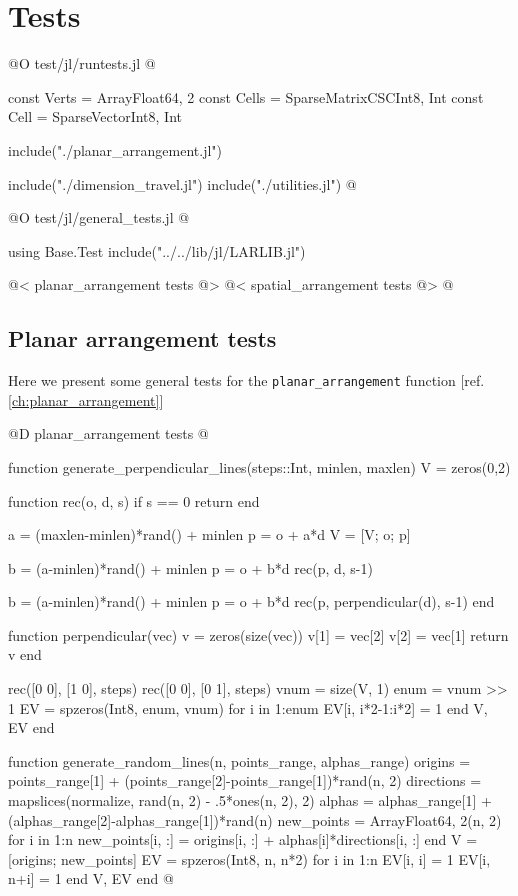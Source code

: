 \chapter{Tests}

@O test/jl/runtests.jl
@{const Verts = Array{Float64, 2}
const Cells = SparseMatrixCSC{Int8, Int}
const Cell = SparseVector{Int8, Int}

include("./planar_arrangement.jl")

include("./dimension_travel.jl")
include("./utilities.jl")
@}

@O test/jl/general_tests.jl
@{using Base.Test
include("../../lib/jl/LARLIB.jl")

@< planar\_arrangement tests @>
@< spatial\_arrangement tests @>
@}

\section{Planar arrangement tests}
\label{ch:planar_arrangement_tests}

Here we present some general tests for the \texttt{planar\_arrangement} function [ref. \ref{ch:planar_arrangement}]

@D planar\_arrangement tests
@{function generate_perpendicular_lines(steps::Int, minlen, maxlen)
    V = zeros(0,2)

    function rec(o, d, s)
        if s == 0 return end

        a = (maxlen-minlen)*rand() + minlen
        p = o + a*d
        V = [V; o; p]

        b = (a-minlen)*rand() + minlen
        p = o + b*d
        rec(p, d, s-1)

        b = (a-minlen)*rand() + minlen
        p = o + b*d
        rec(p, perpendicular(d), s-1)
    end

    function perpendicular(vec)
        v = zeros(size(vec))
        v[1] = vec[2]
        v[2] = vec[1]
        return v
    end

    rec([0 0], [1 0], steps)
    rec([0 0], [0 1], steps)
    vnum = size(V, 1)
    enum = vnum >> 1
    EV = spzeros(Int8, enum, vnum)
    for i in 1:enum
        EV[i, i*2-1:i*2] = 1
    end
    V, EV
end


function generate_random_lines(n, points_range, alphas_range)
    origins = points_range[1] + (points_range[2]-points_range[1])*rand(n, 2)
    directions = mapslices(normalize, rand(n, 2) - .5*ones(n, 2), 2)
    alphas = alphas_range[1] + (alphas_range[2]-alphas_range[1])*rand(n)
    new_points = Array{Float64, 2}(n, 2)
    for i in 1:n
        new_points[i, :] = origins[i, :] + alphas[i]*directions[i, :]
    end
    V = [origins; new_points]
    EV = spzeros(Int8, n, n*2)
    for i in 1:n
        EV[i, i] = 1
        EV[i, n+i] = 1
    end
    V, EV
end
@}

